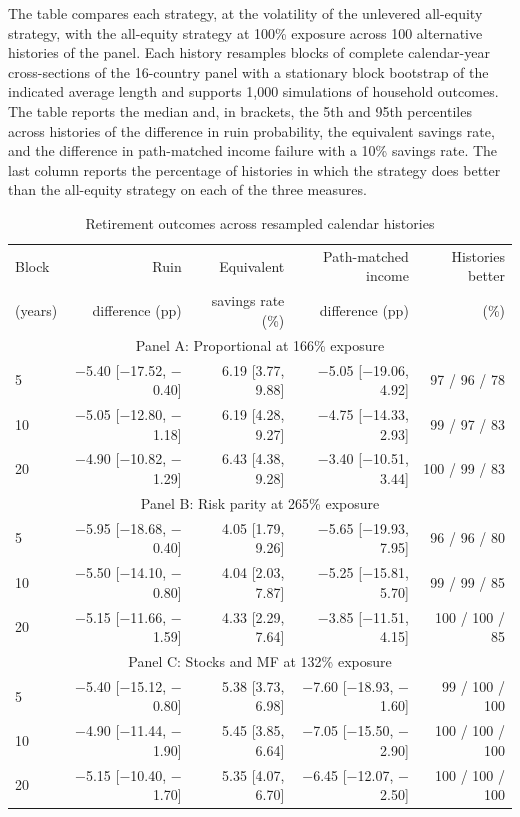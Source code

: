 \begin{table}[p]\centering
\caption{Retirement outcomes across resampled calendar histories}\label{tab:restored-history}
\begin{minipage}{\linewidth}\small The table compares each strategy, at the volatility of the unlevered all-equity strategy, with the all-equity strategy at 100\% exposure across 100 alternative histories of the panel. Each history resamples blocks of complete calendar-year cross-sections of the 16-country panel with a stationary block bootstrap of the indicated average length and supports 1,000 simulations of household outcomes. The table reports the median and, in brackets, the 5th and 95th percentiles across histories of the difference in ruin probability, the equivalent savings rate, and the difference in path-matched income failure with a 10\% savings rate. The last column reports the percentage of histories in which the strategy does better than the all-equity strategy on each of the three measures.\end{minipage}
\medskip

{\small\setlength{\tabcolsep}{3pt}\begin{tabular}{lrrrr}\toprule
Block & Ruin & Equivalent & Path-matched income & Histories better \\
(years) & difference (pp) & savings rate (\%) & difference (pp) & (\%) \\ \midrule
\multicolumn{5}{c}{Panel A: Proportional at 166\% exposure} \\
5 & $-$5.40 [$-$17.52, $-$0.40] & 6.19 [3.77, 9.88] & $-$5.05 [$-$19.06, 4.92] & 97 / 96 / 78 \\
10 & $-$5.05 [$-$12.80, $-$1.18] & 6.19 [4.28, 9.27] & $-$4.75 [$-$14.33, 2.93] & 99 / 97 / 83 \\
20 & $-$4.90 [$-$10.82, $-$1.29] & 6.43 [4.38, 9.28] & $-$3.40 [$-$10.51, 3.44] & 100 / 99 / 83 \\
\multicolumn{5}{c}{Panel B: Risk parity at 265\% exposure} \\
5 & $-$5.95 [$-$18.68, $-$0.40] & 4.05 [1.79, 9.26] & $-$5.65 [$-$19.93, 7.95] & 96 / 96 / 80 \\
10 & $-$5.50 [$-$14.10, $-$0.80] & 4.04 [2.03, 7.87] & $-$5.25 [$-$15.81, 5.70] & 99 / 99 / 85 \\
20 & $-$5.15 [$-$11.66, $-$1.59] & 4.33 [2.29, 7.64] & $-$3.85 [$-$11.51, 4.15] & 100 / 100 / 85 \\
\multicolumn{5}{c}{Panel C: Stocks and MF at 132\% exposure} \\
5 & $-$5.40 [$-$15.12, $-$0.80] & 5.38 [3.73, 6.98] & $-$7.60 [$-$18.93, $-$1.60] & 99 / 100 / 100 \\
10 & $-$4.90 [$-$11.44, $-$1.90] & 5.45 [3.85, 6.64] & $-$7.05 [$-$15.50, $-$2.90] & 100 / 100 / 100 \\
20 & $-$5.15 [$-$10.40, $-$1.70] & 5.35 [4.07, 6.70] & $-$6.45 [$-$12.07, $-$2.50] & 100 / 100 / 100 \\
\bottomrule\end{tabular}}
\end{table}
